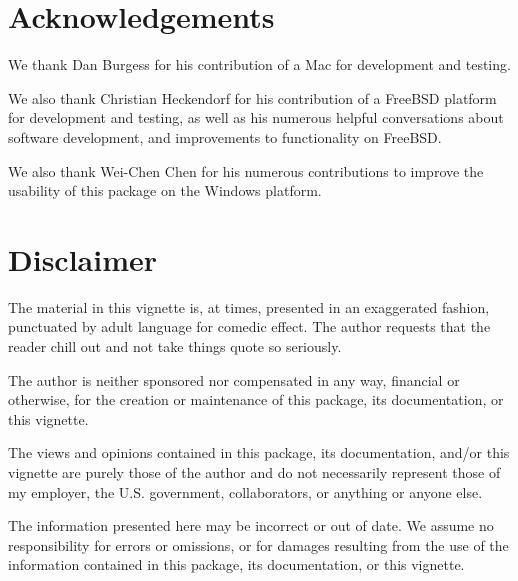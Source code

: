\section*{Acknowledgements}

We thank Dan Burgess for his contribution of a Mac for development and testing.

We also thank Christian Heckendorf for his contribution of a FreeBSD platform for development and 
testing, as well as his numerous helpful conversations about software development, and improvements 
to functionality on FreeBSD.

We also thank Wei-Chen Chen for his numerous contributions to improve the usability of this package 
on the Windows platform.  



\section*{Disclaimer}

The material in this vignette is, at times, presented in an exaggerated fashion, punctuated by adult language for comedic effect.  The author requests that the reader chill out and not take things quote so seriously.  

The author is neither sponsored nor compensated in any way, financial or otherwise, for the creation or maintenance of this package, its documentation, or this vignette.  

The views and opinions contained in this package, its documentation, and/or this vignette are purely those of the author and do not necessarily represent those of my employer, the U.S. government, collaborators, or anything or anyone else.

The information presented here may be incorrect or out of date.   We assume no responsibility for errors or omissions, or for damages resulting from the use of the information contained in this package, its documentation, or this vignette.
